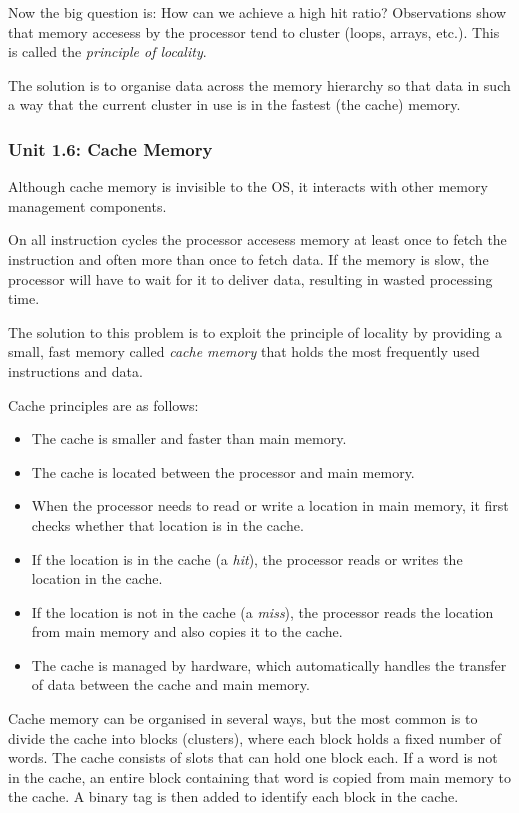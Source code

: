 \documentclass{article}
\begin{document}
Now the big question is: How can we achieve a high hit ratio?
Observations show that memory accesess by the processor tend to cluster (loops, arrays, etc.). This is called the \textit{principle of locality}.

The solution is to organise data across the memory hierarchy so that data in such a way that the current cluster in use is in the fastest (the cache) memory.


\subsubsection*{Unit 1.6: Cache Memory}
{}

Although cache memory is invisible to the OS, it interacts with other memory management components.

On all instruction cycles the processor accesess memory at least once to fetch the instruction and 
often more than once to fetch data. If the memory is slow, the processor will have to wait for it to deliver data, 
resulting in wasted processing time.

The solution to this problem is to exploit the principle of locality by providing a small, fast memory called \textit{cache memory} that holds the most frequently 
used instructions and data.

Cache principles are as follows:
\begin{itemize}
    \item The cache is smaller and faster than main memory.
    \item The cache is located between the processor and main memory.
    \item When the processor needs to read or write a location in main memory, it first checks whether that location is in the cache.
    \item If the location is in the cache (a \textit{hit}), the processor reads or writes the location in the cache.
    \item If the location is not in the cache (a \textit{miss}), the processor reads the location from main memory and also copies it to the cache.
    \item The cache is managed by hardware, which automatically handles the transfer of data between the cache and main memory.
\end{itemize}

Cache memory can be organised in several ways, but the most common is to divide the cache into blocks (clusters), where each block holds a fixed number of words.
The cache consists of slots that can hold one block each. If a word is not in the cache, an entire block containing that word is copied from main memory to the cache.
A binary tag is then added to identify each block in the cache.
\end{document}
